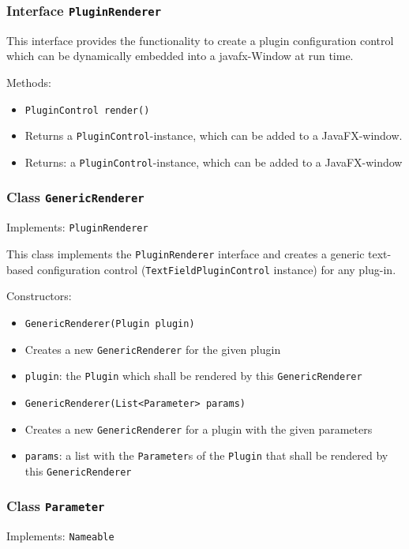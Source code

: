 \documentclass[parskip=full,11pt]{scrartcl}
\begin{document}
\subsubsection{Interface \texttt{PluginRenderer}}

This interface provides the functionality to create a plugin configuration control which can be dynamically embedded into a javafx-Window at run time.

Methods:

\begin{itemize}\itemsep -10pt
	\item \texttt{PluginControl render()}
	\item[] Returns a \texttt{PluginControl}-instance, which can be added to a JavaFX-window.
	\item[] Returns: a \texttt{PluginControl}-instance, which can be added to a JavaFX-window
\end{itemize}

\subsubsection{Class \texttt{GenericRenderer}}
Implements: \texttt{PluginRenderer}

This class implements the \texttt{PluginRenderer} interface and creates a generic text-based configuration control (\texttt{TextFieldPluginControl} instance) for any plug-in.

Constructors:

\begin{itemize}\itemsep -10pt
	\item \texttt{GenericRenderer(Plugin plugin)}
	\item[] Creates a new \texttt{GenericRenderer} for the given plugin
	\item[] \texttt{plugin}: the \texttt{Plugin} which shall be rendered by this \texttt{GenericRenderer}

	\item \texttt{GenericRenderer(List<Parameter> params)}
	\item[] Creates a new \texttt{GenericRenderer} for a plugin with the given parameters
	\item[] \texttt{params}: a list with the \texttt{Parameter}s of the \texttt{Plugin} that shall be rendered by this \texttt{GenericRenderer}
\end{itemize}

\subsubsection{Class \texttt{Parameter}}
Implements: \texttt{Nameable}
\end{document}
